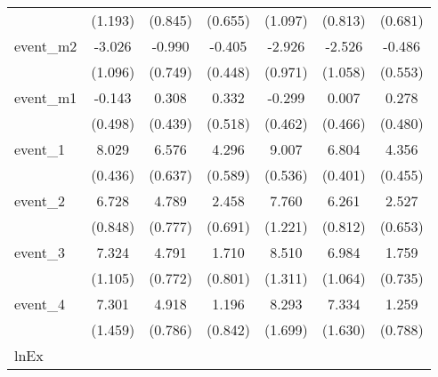 {\begin{tabular}{l*{6}{c}}
            &     (1.193)         &     (0.845)         &     (0.655)         &     (1.097)         &     (0.813)         &     (0.681)         \\
[1em]
event\_m2    &      -3.026\sym{**} &      -0.990         &      -0.405         &      -2.926\sym{**} &      -2.526\sym{*}  &      -0.486         \\
            &     (1.096)         &     (0.749)         &     (0.448)         &     (0.971)         &     (1.058)         &     (0.553)         \\
[1em]
event\_m1    &      -0.143         &       0.308         &       0.332         &      -0.299         &       0.007         &       0.278         \\
            &     (0.498)         &     (0.439)         &     (0.518)         &     (0.462)         &     (0.466)         &     (0.480)         \\
[1em]
event\_1     &       8.029\sym{***}&       6.576\sym{***}&       4.296\sym{***}&       9.007\sym{***}&       6.804\sym{***}&       4.356\sym{***}\\
            &     (0.436)         &     (0.637)         &     (0.589)         &     (0.536)         &     (0.401)         &     (0.455)         \\
[1em]
event\_2     &       6.728\sym{***}&       4.789\sym{***}&       2.458\sym{***}&       7.760\sym{***}&       6.261\sym{***}&       2.527\sym{***}\\
            &     (0.848)         &     (0.777)         &     (0.691)         &     (1.221)         &     (0.812)         &     (0.653)         \\
[1em]
event\_3     &       7.324\sym{***}&       4.791\sym{***}&       1.710\sym{*}  &       8.510\sym{***}&       6.984\sym{***}&       1.759\sym{*}  \\
            &     (1.105)         &     (0.772)         &     (0.801)         &     (1.311)         &     (1.064)         &     (0.735)         \\
[1em]
event\_4     &       7.301\sym{***}&       4.918\sym{***}&       1.196         &       8.293\sym{***}&       7.334\sym{***}&       1.259         \\
            &     (1.459)         &     (0.786)         &     (0.842)         &     (1.699)         &     (1.630)         &     (0.788)         \\
\hline
lnEx        &                     &                     &                     &                     &                     &                     \\

\end{tabular}}
